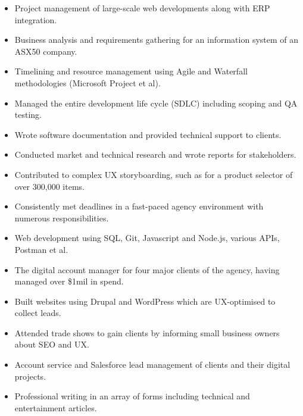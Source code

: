 \documentclass{resume}
\begin{document}
\begin{flushleft}


    \begin{itemize}
    \item Project management of large-scale web developments along with ERP integration.
    \item Business analysis and requirements gathering for an information system of an ASX50 company.
    \item Timelining and resource management using Agile and Waterfall methodologies (Microsoft Project et al).
    \item Managed the entire development life cycle (SDLC) including scoping and QA testing.
    \item Wrote software documentation and provided technical support to clients.
    \item Conducted market and technical research and wrote reports for stakeholders.
    \item Contributed to complex UX storyboarding, such as for a product selector of over 300,000 items.
    \item Consistently met deadlines in a fast-paced agency environment with numerous responsibilities.
    \item Web development using SQL, Git, Javascript and Node.js, various APIs, Postman et al.
    \item The digital account manager for four major clients of the agency, having managed over \$1mil in spend.
    \end{itemize}


    \begin{itemize}
    \item Built websites using Drupal and WordPress which are UX-optimised to collect leads.
    \item Attended trade shows to gain clients by informing small business owners about SEO and UX.
    \end{itemize}


    \begin{itemize}
    \item Account service and Salesforce lead management of clients and their digital projects.
    \item Professional writing in an array of forms including technical and entertainment articles.
    \end{itemize}

\end{flushleft}
\end{document}
